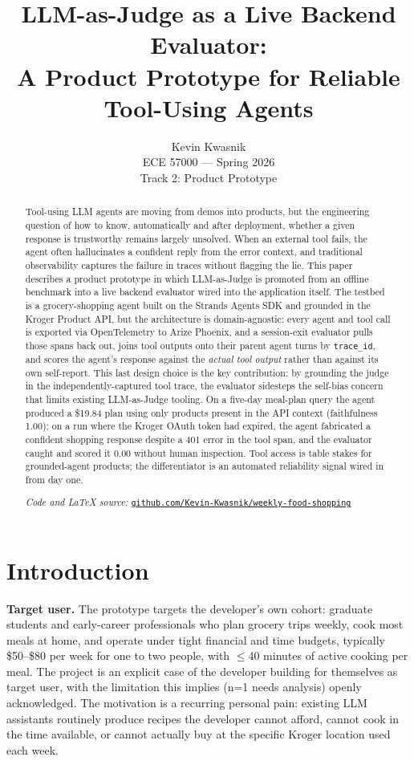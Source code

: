 \documentclass{article}
\title{LLM-as-Judge as a Live Backend Evaluator: \\
A Product Prototype for Reliable Tool-Using Agents}
\author{Kevin Kwasnik \\ ECE 57000 --- Spring 2026 \\ Track 2: Product Prototype}
\date{}
\begin{document}
\maketitle

\begin{abstract}
Tool-using LLM agents are moving from demos into products, but the engineering question of how to know, automatically and after deployment, whether a given response is trustworthy remains largely unsolved. When an external tool fails, the agent often hallucinates a confident reply from the error context, and traditional observability captures the failure in traces without flagging the lie. This paper describes a product prototype in which LLM-as-Judge is promoted from an offline benchmark into a live backend evaluator wired into the application itself. The testbed is a grocery-shopping agent built on the Strands Agents SDK and grounded in the Kroger Product API, but the architecture is domain-agnostic: every agent and tool call is exported via OpenTelemetry to Arize Phoenix, and a session-exit evaluator pulls those spans back out, joins tool outputs onto their parent agent turns by \texttt{trace\_id}, and scores the agent's response against the \emph{actual tool output} rather than against its own self-report. This last design choice is the key contribution: by grounding the judge in the independently-captured tool trace, the evaluator sidesteps the self-bias concern that limits existing LLM-as-Judge tooling. On a five-day meal-plan query the agent produced a \$19.84 plan using only products present in the API context (faithfulness 1.00); on a run where the Kroger OAuth token had expired, the agent fabricated a confident shopping response despite a 401 error in the tool span, and the evaluator caught and scored it 0.00 without human inspection. Tool access is table stakes for grounded-agent products; the differentiator is an automated reliability signal wired in from day one.

\vspace{0.5em}
\noindent\textit{Code and LaTeX source:} \href{https://github.com/Kevin-Kwasnik/weekly-food-shopping}{\texttt{github.com/Kevin-Kwasnik/weekly-food-shopping}}
\end{abstract}

\section{Introduction}

\textbf{Target user.} The prototype targets the developer's own cohort: graduate students and early-career professionals who plan grocery trips weekly, cook most meals at home, and operate under tight financial and time budgets, typically \$50--\$80 per week for one to two people, with $\le$40 minutes of active cooking per meal. The project is an explicit case of the developer building for themselves as target user, with the limitation this implies (n=1 needs analysis) openly acknowledged. The motivation is a recurring personal pain: existing LLM assistants routinely produce recipes the developer cannot afford, cannot cook in the time available, or cannot actually buy at the specific Kroger location used each week.
\end{document}
